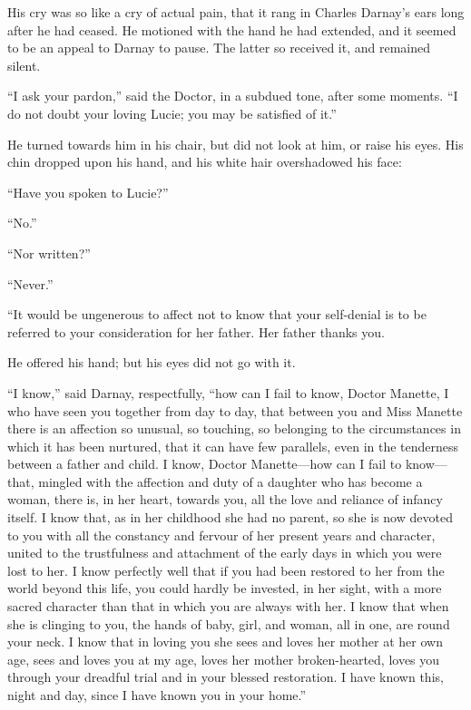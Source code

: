 His cry was so like a cry of actual pain, that it rang in Charles
Darnay's ears long after he had ceased.  He motioned with the hand he
had extended, and it seemed to be an appeal to Darnay to pause.
The latter so received it, and remained silent.

``I ask your pardon,'' said the Doctor, in a subdued tone, after some
moments.  ``I do not doubt your loving Lucie; you may be satisfied of it.''

He turned towards him in his chair, but did not look at him, or raise
his eyes.  His chin dropped upon his hand, and his white hair
overshadowed his face:

``Have you spoken to Lucie?''

``No.''

``Nor written?''

``Never.''

``It would be ungenerous to affect not to know that your self-denial
is to be referred to your consideration for her father.  Her father
thanks you.

He offered his hand; but his eyes did not go with it.

``I know,'' said Darnay, respectfully, ``how can I fail to know,
Doctor Manette, I who have seen you together from day to day,
that between you and Miss Manette there is an affection so unusual,
so touching, so belonging to the circumstances in which it has been
nurtured, that it can have few parallels, even in the tenderness
between a father and child.  I know, Doctor Manette---how can I fail
to know---that, mingled with the affection and duty of a daughter who
has become a woman, there is, in her heart, towards you, all the love
and reliance of infancy itself.  I know that, as in her childhood she
had no parent, so she is now devoted to you with all the constancy
and fervour of her present years and character, united to the
trustfulness and attachment of the early days in which you were lost
to her.  I know perfectly well that if you had been restored to her
from the world beyond this life, you could hardly be invested, in her
sight, with a more sacred character than that in which you are always
with her.  I know that when she is clinging to you, the hands of baby,
girl, and woman, all in one, are round your neck.  I know that in
loving you she sees and loves her mother at her own age, sees and
loves you at my age, loves her mother broken-hearted, loves you
through your dreadful trial and in your blessed restoration.  I have
known this, night and day, since I have known you in your home.''

